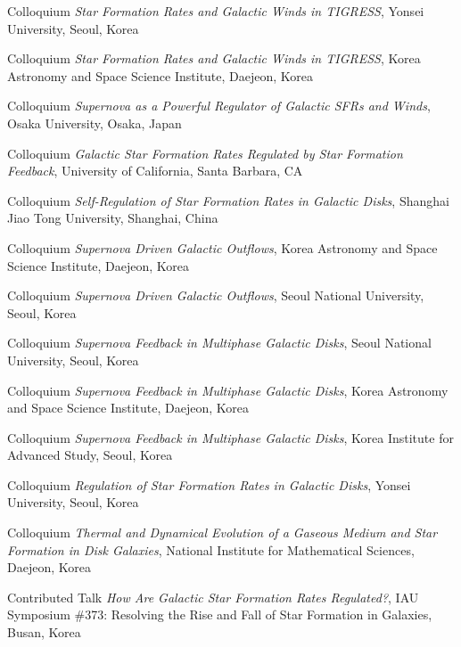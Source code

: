 \documentclass[12pt]{article}
\begin{document}
{Colloquium}
{\emph{Star Formation Rates and Galactic Winds in TIGRESS},
Yonsei University,
Seoul, Korea}

{Colloquium}
{\emph{Star Formation Rates and Galactic Winds in TIGRESS},
Korea Astronomy and Space Science Institute,
Daejeon, Korea}

{Colloquium}
{\emph{Supernova as a Powerful Regulator of Galactic SFRs and Winds},
Osaka University,
Osaka, Japan}

{Colloquium}
{\emph{Galactic Star Formation Rates Regulated by Star Formation Feedback},
University of California,
Santa Barbara, CA}

{Colloquium}
{\emph{Self-Regulation of Star Formation Rates in Galactic Disks},
Shanghai Jiao Tong University,
Shanghai, China}

{Colloquium}
{\emph{Supernova Driven Galactic Outflows},
Korea Astronomy and Space Science Institute,
Daejeon, Korea}

{Colloquium}
{\emph{Supernova Driven Galactic Outflows},
Seoul National University,
Seoul, Korea}

{Colloquium}
{\emph{Supernova Feedback in Multiphase Galactic Disks},
Seoul National University,
Seoul, Korea}

{Colloquium}
{\emph{Supernova Feedback in Multiphase Galactic Disks},
Korea Astronomy and Space Science Institute,
Daejeon, Korea}

{Colloquium}
{\emph{Supernova Feedback in Multiphase Galactic Disks},
Korea Institute for Advanced Study,
Seoul, Korea}

{Colloquium}
{\emph{Regulation of Star Formation Rates in Galactic Disks},
Yonsei University,
Seoul, Korea}

{Colloquium}
{\emph{Thermal and Dynamical Evolution of a Gaseous Medium and Star Formation in Disk Galaxies},
National Institute for Mathematical Sciences,
Daejeon, Korea}



{Contributed Talk}
{\emph{How Are Galactic Star Formation Rates Regulated?},
IAU Symposium \#373: Resolving the Rise and Fall of Star Formation in Galaxies,
Busan, Korea}
\end{document}
